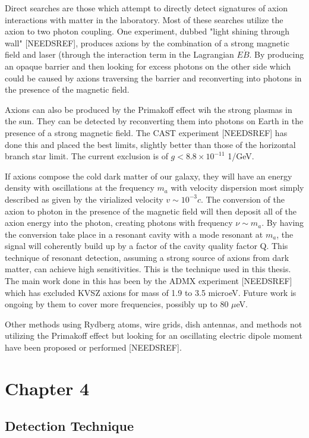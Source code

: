 \documentclass[12pt, twoside]{book}
\begin{document}
Direct searches are those which attempt to directly detect signatures of axion interactions with matter in the laboratory. Most of these searches utilize the axion to two photon coupling. One experiment, dubbed "light shining through wall" [NEEDSREF], produces axions by the combination of a strong magnetic field and laser (through the interaction term in the Lagrangian $E \dot B$. By producing an opaque barrier and then looking for excess photons on the other side which could be caused by axions traversing the barrier and reconverting into photons in the presence of the magnetic field.

Axions can also be produced by the Primakoff effect wih the strong plasmas in the sun. They can be detected by reconverting them into photons on Earth in the presence of a strong magnetic field. The CAST experiment [NEEDSREF] has done this and placed the best limits, slightly better than those of the horizontal branch star limit. The current exclusion is of $g < 8.8 \times 10^{-11}$ 1/GeV.

If axions compose the cold dark matter of our galaxy, they will have an energy density with oscillations at the frequency $m_a$ with velocity dispersion most simply described as given by the virialized velocity $v \sim 10^{-3}c$. The conversion of the axion to photon in the presence of the magnetic field will then deposit all of the axion energy into the photon, creating photons with frequency $\nu \sim m_a$. By having the conversion take place in a resonant cavity with a mode resonant at $m_a$, the signal will coherently build up by a factor of the cavity quality factor Q. This technique of resonant detection, assuming a strong source of axions from dark matter, can achieve high sensitivities. This is the technique used in this thesis. The main work done in this has been by the ADMX experiment [NEEDSREF] which has excluded KVSZ axions for mass of 1.9 to 3.5 microeV. Future work is ongoing by them to cover more frequencies, possibly up to 80 $\mu$eV.

Other methods using Rydberg atoms, wire grids, dish antennas, and methods not utilizing the Primakoff effect but looking for an oscillating electric dipole moment have been proposed or performed [NEEDSREF].


\chapter{Chapter 4}
\section{Detection Technique}
\end{document}
